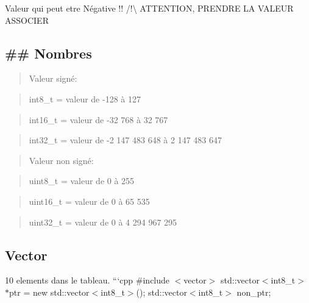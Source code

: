 Valeur qui peut etre Négative !! /!\textbackslash{} A\-T\-T\-E\-N\-T\-I\-O\-N, P\-R\-E\-N\-D\-R\-E L\-A V\-A\-L\-E\-U\-R A\-S\-S\-O\-C\-I\-E\-R

\subsection*{\#\# Nombres }

\begin{quotation}
Valeur signé\-:

\end{quotation}


\begin{quotation}
int8\-\_\-t = valeur de -\/128 à 127

\end{quotation}


\begin{quotation}
int16\-\_\-t = valeur de -\/32 768 à 32 767

\end{quotation}


\begin{quotation}
int32\-\_\-t = valeur de -\/2 147 483 648 à 2 147 483 647

\end{quotation}


\begin{quotation}
Valeur non signé\-:

\end{quotation}


\begin{quotation}
uint8\-\_\-t = valeur de 0 à 255

\end{quotation}


\begin{quotation}
uint16\-\_\-t = valeur de 0 à 65 535

\end{quotation}


\begin{quotation}
uint32\-\_\-t = valeur de 0 à 4 294 967 295

\end{quotation}


\subsection*{Vector}






\begin{DoxyItemize}
\item 10 elements dans le tableau. ```cpp \#include $<$vector$>$ std\-::vector$<$int8\-\_\-t$>$ $\ast$ptr = new std\-::vector$<$int8\-\_\-t$>$(); std\-::vector$<$int8\-\_\-t$>$ non\-\_\-ptr;
\end{DoxyItemize}

